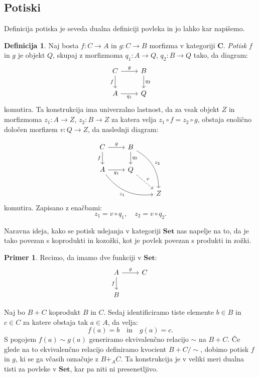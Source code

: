 \documentclass[12pt,a4paper]{book}
\theoremstyle{definition}
\newtheorem{definicija}{Definicija}[chapter]
\theoremstyle{plain}
\theoremstyle{definition}
\newtheorem{primer}{Primer}[section]
\theoremstyle{remark}
\newcommand{\cat}[1]{\textbf{#1}}
\begin{document}
\subsection{Potiski}

Definicija potiska je seveda dualna definiciji povleka in jo lahko kar napišemo.

\begin{definicija}
Naj bosta $f: C \to A$ in $g : C \to B$ morfizma v kategoriji $\cat{C}$. \emph{Potisk} $f$ in $g$ je objekt $Q$, skupaj z morfizmoma $q_1 : A \to Q$, $q_2 : B \to Q$ tako, da diagram:
$$\begin{tikzcd}
C \ar[r, "g"] \ar[d, "f"'] & B \ar[d, "q_2"] \\
A \ar[r, "q_1"'] & Q
\end{tikzcd}$$
komutira. Ta konstrukcija ima univerzalno lastnost, da za vsak objekt $Z$ in morfizmoma $z_1 : A \to Z$, $z_2 : B \to Z$ za katera velja $z_1 \circ f = z_2 \circ g$, obstaja enolično določen morfizem $v : Q \to Z$, da naslednji diagram:

$$\begin{tikzcd}
C \ar[r, "g"] \ar[d, "f"'] & B \ar[d, "q_2"] \ar[ddr, bend left, "z_2"] & \\
A \ar[r, "q_1"'] \ar[drr, bend right, "z_1"'] & Q \ar[dr, dashed, "v"] & \\
& & Z 
\end{tikzcd}$$
komutira. Zapisano z enačbami:
$$z_1 = v \circ  q_1, \quad z_2 = v \circ q_2.$$
\end{definicija}

Naravna ideja, kako se potisk udejanja v kategoriji $\cat{Set}$ nas napelje na to, da je tako povezan s koprodukti in kozožki, kot je povlek povezan s produkti in zožki.

\begin{primer}
Recimo, da imamo dve funkciji v $\cat{Set}$:
$$ \begin{tikzcd}
A \ar[d, "f"'] \ar[r, "g"] & C \\
B &
\end{tikzcd} $$

Naj bo $B + C$ koprodukt $B$ in $C$. Sedaj identificiramo tiste elemente $b \in B$ in $c \in C$ za katere obstaja tak $a \in A$, da velja:
$$f(a) = b \quad \text{in} \quad g(a) = c.$$
S pogojem $f(a) \sim g(a)$ generiramo ekvivalenčno relacijo $\sim$ na $B + C$. Če glede na to ekvivalenčno relacijo definiramo kvocient $B + C/{\sim}$, dobimo potisk $f$ in $g$, ki se ga včasih označuje z $B +_A C$. Ta konstrukcija je v veliki meri dualna tisti za povleke v $\cat{Set}$, kar pa niti ni presenetljivo.

\end{primer}
\end{document}
